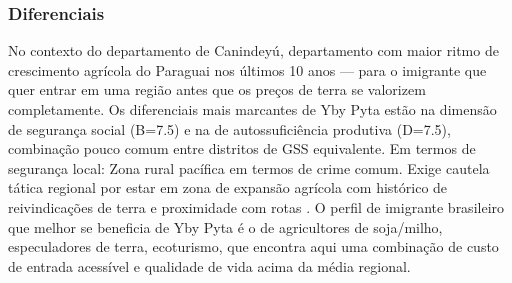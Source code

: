 \subsubsection*{Diferenciais}\label{dif-yby-pyta-1413}
No contexto do departamento de Canindeyú, departamento com maior ritmo de crescimento agrícola do Paraguai nos últimos 10 anos — para o imigrante que quer entrar em uma região antes que os preços de terra se valorizem completamente. Os diferenciais mais marcantes de Yby Pyta estão na dimensão de segurança social (B=7.5) e na de autossuficiência produtiva (D=7.5), combinação pouco comum entre distritos de GSS equivalente. Em termos de segurança local: Zona rural pacífica em termos de crime comum. Exige cautela tática regional por estar em zona de expansão agrícola com histórico de reivindicações de terra e proximidade com rotas . O perfil de imigrante brasileiro que melhor se beneficia de Yby Pyta é o de agricultores de soja/milho, especuladores de terra, ecoturismo, que encontra aqui uma combinação de custo de entrada acessível e qualidade de vida acima da média regional.
